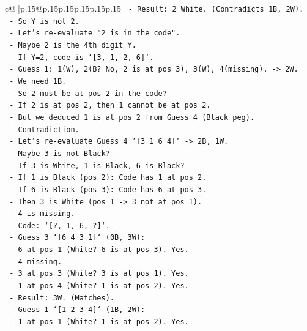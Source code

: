 \documentclass{article}
\begin{document}
{\begin{supertabular}{c@{$\;$}|p{.15\linewidth}@{}p{.15\linewidth}p{.15\linewidth}p{.15\linewidth}p{.15\linewidth}p{.15\linewidth}}
{{{\texttt{        {-} Result: 2 White. (Contradicts 1B, 2W).} \\
\texttt{      {-} So Y is not 2.} \\
\texttt{    {-} Let's re{-}evaluate "2 is in the code".} \\
\texttt{      {-} Maybe 2 is the 4th digit Y.} \\
\texttt{      {-} If Y=2, code is `{[}3, 1, 2, 6{]}`.} \\
\texttt{      {-} Guess 1: 1(W), 2(B? No, 2 is at pos 3), 3(W), 4(missing). {-}> 2W.} \\
\texttt{      {-} We need 1B.} \\
\texttt{      {-} So 2 must be at pos 2 in the code?} \\
\texttt{      {-} If 2 is at pos 2, then 1 cannot be at pos 2.} \\
\texttt{      {-} But we deduced 1 is at pos 2 from Guess 4 (Black peg).} \\
\texttt{      {-} Contradiction.} \\
\texttt{    {-} Let's re{-}evaluate Guess 4 `{[}3 1 6 4{]}` {-}> 2B, 1W.} \\
\texttt{      {-} Maybe 3 is not Black?} \\
\texttt{      {-} If 3 is White, 1 is Black, 6 is Black?} \\
\texttt{      {-} If 1 is Black (pos 2): Code has 1 at pos 2.} \\
\texttt{      {-} If 6 is Black (pos 3): Code has 6 at pos 3.} \\
\texttt{      {-} Then 3 is White (pos 1 {-}> 3 not at pos 1).} \\
\texttt{      {-} 4 is missing.} \\
\texttt{      {-} Code: `{[}?, 1, 6, ?{]}`.} \\
\texttt{      {-} Guess 3 `{[}6 4 3 1{]}` (0B, 3W):} \\
\texttt{        {-} 6 at pos 1 (White? 6 is at pos 3). Yes.} \\
\texttt{        {-} 4 missing.} \\
\texttt{        {-} 3 at pos 3 (White? 3 is at pos 1). Yes.} \\
\texttt{        {-} 1 at pos 4 (White? 1 is at pos 2). Yes.} \\
\texttt{        {-} Result: 3W. (Matches).} \\
\texttt{      {-} Guess 1 `{[}1 2 3 4{]}` (1B, 2W):} \\
\texttt{        {-} 1 at pos 1 (White? 1 is at pos 2). Yes.} \\
}}}
\end{supertabular}}
\end{document}
